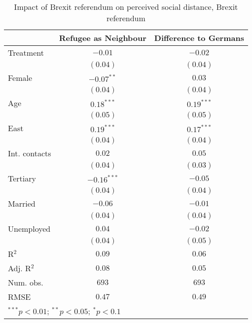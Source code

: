 
\begin{table}
\caption{Impact of Brexit referendum on perceived social distance, Brexit referendum}
\begin{center}
\begin{tabular}{l c c}
\toprule
 & Refugee as Neighbour & Difference to Germans \\
\midrule
Treatment     & $-0.01$       & $-0.02$      \\
              & $(0.04)$      & $(0.04)$     \\
Female        & $-0.07^{**}$  & $0.03$       \\
              & $(0.04)$      & $(0.04)$     \\
Age           & $0.18^{***}$  & $0.19^{***}$ \\
              & $(0.05)$      & $(0.05)$     \\
East          & $0.19^{***}$  & $0.17^{***}$ \\
              & $(0.04)$      & $(0.04)$     \\
Int. contacts & $0.02$        & $0.05$       \\
              & $(0.04)$      & $(0.03)$     \\
Tertiary      & $-0.16^{***}$ & $-0.05$      \\
              & $(0.04)$      & $(0.04)$     \\
Married       & $-0.06$       & $-0.01$      \\
              & $(0.04)$      & $(0.04)$     \\
Unemployed    & $0.04$        & $-0.02$      \\
              & $(0.04)$      & $(0.05)$     \\
\midrule
R$^2$         & $0.09$        & $0.06$       \\
Adj. R$^2$    & $0.08$        & $0.05$       \\
Num. obs.     & $693$         & $693$        \\
RMSE          & $0.47$        & $0.49$       \\
\bottomrule
\multicolumn{3}{l}{\scriptsize{$^{***}p<0.01$; $^{**}p<0.05$; $^{*}p<0.1$}}
\end{tabular}
\label{tab_dist_brexit}
\end{center}
\end{table}
